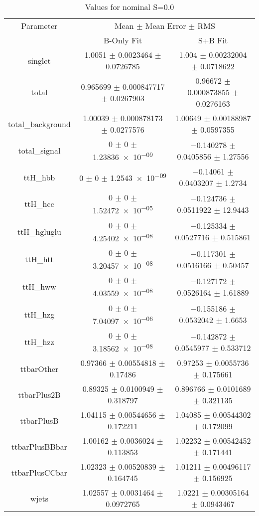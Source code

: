 \begin{table}
\centering
\caption{Values for nominal S=0.0}
\begin{tabular}{ccc}
\toprule
Parameter & \multicolumn{2}{c}{Mean $\pm$ Mean Error $\pm$ RMS}\\
 & B-Only Fit & S+B Fit\\
\midrule
singlet & \num{1.0051} $\pm$ \num{0.0023464} $\pm$ \num{0.0726785} & \num{1.004} $\pm$ \num{0.00232004} $\pm$ \num{0.0718622}\\
total & \num{0.965699} $\pm$ \num{0.000847717} $\pm$ \num{0.0267903} & \num{0.96672} $\pm$ \num{0.000873855} $\pm$ \num{0.0276163}\\
total\_background & \num{1.00039} $\pm$ \num{0.000878173} $\pm$ \num{0.0277576} & \num{1.00649} $\pm$ \num{0.00188987} $\pm$ \num{0.0597355}\\
total\_signal & \num{0} $\pm$ \num{0} $\pm$ \num{1.23836e-09} & \num{-0.140278} $\pm$ \num{0.0405856} $\pm$ \num{1.27556}\\
ttH\_hbb & \num{0} $\pm$ \num{0} $\pm$ \num{1.2543e-09} & \num{-0.14061} $\pm$ \num{0.0403207} $\pm$ \num{1.2734}\\
ttH\_hcc & \num{0} $\pm$ \num{0} $\pm$ \num{1.52472e-05} & \num{-0.124736} $\pm$ \num{0.0511922} $\pm$ \num{12.9443}\\
ttH\_hgluglu & \num{0} $\pm$ \num{0} $\pm$ \num{4.25402e-08} & \num{-0.125334} $\pm$ \num{0.0527716} $\pm$ \num{0.515861}\\
ttH\_htt & \num{0} $\pm$ \num{0} $\pm$ \num{3.20457e-08} & \num{-0.117301} $\pm$ \num{0.0516166} $\pm$ \num{0.50457}\\
ttH\_hww & \num{0} $\pm$ \num{0} $\pm$ \num{4.03559e-08} & \num{-0.127172} $\pm$ \num{0.0526164} $\pm$ \num{1.61889}\\
ttH\_hzg & \num{0} $\pm$ \num{0} $\pm$ \num{7.04097e-06} & \num{-0.155186} $\pm$ \num{0.0532042} $\pm$ \num{1.6653}\\
ttH\_hzz & \num{0} $\pm$ \num{0} $\pm$ \num{3.18562e-08} & \num{-0.142872} $\pm$ \num{0.0545977} $\pm$ \num{0.533712}\\
ttbarOther & \num{0.97366} $\pm$ \num{0.00554818} $\pm$ \num{0.17486} & \num{0.97253} $\pm$ \num{0.0055736} $\pm$ \num{0.175661}\\
ttbarPlus2B & \num{0.89325} $\pm$ \num{0.0100949} $\pm$ \num{0.318797} & \num{0.896766} $\pm$ \num{0.0101689} $\pm$ \num{0.321135}\\
ttbarPlusB & \num{1.04115} $\pm$ \num{0.00544656} $\pm$ \num{0.172211} & \num{1.04085} $\pm$ \num{0.00544302} $\pm$ \num{0.172099}\\
ttbarPlusBBbar & \num{1.00162} $\pm$ \num{0.0036024} $\pm$ \num{0.113853} & \num{1.02232} $\pm$ \num{0.00542452} $\pm$ \num{0.171441}\\
ttbarPlusCCbar & \num{1.02323} $\pm$ \num{0.00520839} $\pm$ \num{0.164745} & \num{1.01211} $\pm$ \num{0.00496117} $\pm$ \num{0.156925}\\
wjets & \num{1.02557} $\pm$ \num{0.0031464} $\pm$ \num{0.0972765} & \num{1.0221} $\pm$ \num{0.00305164} $\pm$ \num{0.0943467}\\
\bottomrule
\end{tabular}
\end{table}